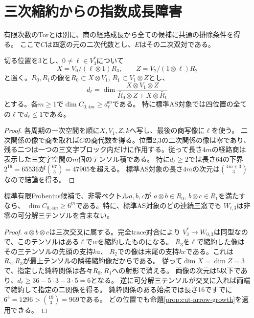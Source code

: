 \section{三次縮約からの指数成長障害}
\label{sec:cubic-slice-growth}
有限次数のTorとは別に、商の経路成長から全ての候補に共通の排除条件を得る。
ここで$C$は四窓の元の二次代数とし、$E$はその二次双対である。

\begin{proposition}[一つの矢空間を一次元へ落とす成長検査]\label{prop:cut-arrow-growth}
切る位置を3とし、$0\ne\ell\in V_3^*$について
\[
 X=V_0/(\ell\otimes1)R_3,\qquad Z=V_2/(1\otimes\ell)R_2
\]
と置く。$R_0,R_1$の像を$\bar R_0\subset X\otimes V_1$,
$\bar R_1\subset V_1\otimes Z$とし、
\[
 d_\ell=\dim \frac{X\otimes V_1\otimes Z}
              {\bar R_0\otimes Z+X\otimes\bar R_1}
\]
とする。各$m\ge1$で$\dim C_{0,4m}\ge d_\ell^m$である。
特に標準AS対象では四位置の全ての$\ell$で$d_\ell\le1$である。
\end{proposition}
\begin{proof}
各周期の一次空間を順に$X,V_1,Z,k$へ写し、最後の商写像に$\ell$を使う。
二次関係の像で商を取れば$C$の商代数を得る。位置2,3の二次関係の像は零であり、
残る二つは一つの三文字ブロック内だけに作用する。従って長さ$4m$の経路商は
表示した三文字空間の$m$個のテンソル積である。
特に$d_\ell\ge2$では長さ64の下界$2^{16}=65536$が$\binom{67}{3}=47905$を超える。
標準AS対象の長さ$4m$の次元は$\binom{4m+3}{3}$なので結論を得る。
\end{proof}

\begin{theorem}[連続する二つの純粋関係の排除]\label{thm:no-consecutive-pure-relations}
標準有限Frobenius候補で、非零ベクトル$a,b,c$が
$a\otimes b\in R_0$, $b\otimes c\in R_1$を満たすなら、
$\dim C_{0,4m}\ge6^m$である。特に、標準AS対象のどの連続三窓でも
$W_{i,3}$は非零の可分解三テンソルを含まない。
\end{theorem}
\begin{proof}
$a\otimes b\otimes c$は三次交叉に属する。完全trace対合により
$V_3^*\to W_{0,3}$は同型なので、このテンソルはある$\ell$で$w$を縮約したものになる。
$R_3$を$\ell$で縮約した像はその三テンソルの先頭の支持$ka$、
$R_2$での像は末尾の支持$kc$である。これは$R_2,R_3$が最上テンソルの隣接縮約像だからである。
従って$\dim X=\dim Z=3$で、指定した純粋関係は各々$\bar R_0,\bar R_1$への射影で消える。
両像の次元は5以下であり、$d_\ell\ge36-5\cdot3-3\cdot5=6$となる。
逆に可分解三テンソルが交叉に入れば両端で縮約して指定の二関係を得る。
純粋関係のある始点では長さ16ですでに$6^4=1296>\binom{19}{3}=969$である。
どの位置でも命題\ref{prop:cut-arrow-growth}を適用できる。
\end{proof}

